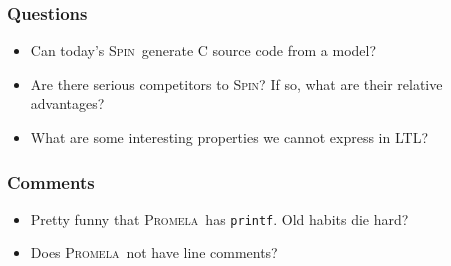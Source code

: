 \documentclass{article}
\newcommand{\spin}{\textsc{Spin}}
\newcommand{\promela}{\textsc{Promela}}
\begin{document}

\subsubsection*{Questions}
\begin{itemize}
\item
  Can today's \spin\ generate C source code from a model?
\item
  Are there serious competitors to \spin ?
  If so, what are their relative advantages?
\item
  What are some interesting properties we cannot express in LTL?
\end{itemize}

\subsubsection*{Comments}
\begin{itemize}
\item
  Pretty funny that \promela\ has {\tt printf}.
  Old habits die hard?
\item
  Does \promela\ not have line comments?
\end{itemize}


\footnotesize


\end{document}

